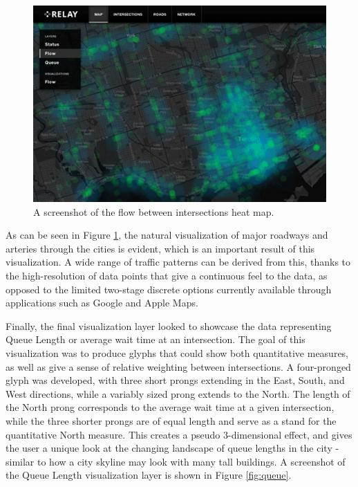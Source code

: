 \documentclass{report}
\begin{document}
\begin{figure}[htbp!]
  \begin{centering}
    \includegraphics[scale=0.9]{figures/flow-2.png}
    \caption{A screenshot of the flow between intersections heat map.}
    \label{fig:flow-2}
  \end{centering}
\end{figure}

As can be seen in Figure \ref{fig:flow-2}, the natural visualization of major roadways and arteries through the cities is evident, which is an important result of this visualization.
A wide range of traffic patterns can be derived from this, thanks to the high-resolution of data points that give a continuous feel to the data, as opposed to the limited two-stage discrete options currently available through applications such as Google and Apple Maps.

Finally, the final visualization layer looked to showcase the data representing Queue Length or average wait time at an intersection.
The goal of this visualization was to produce glyphs that could show both quantitative measures, as well as give a sense of relative weighting between intersections.
A four-pronged glyph was developed, with three short prongs extending in the East, South, and West directions, while a variably sized prong extends to the North.
The length of the North prong corresponds to the average wait time at a given intersection, while the three shorter prongs are of equal length and serve as a stand for the quantitative North measure.
This creates a pseudo 3-dimensional effect, and gives the user a unique look at the changing landscape of queue lengths in the city - similar to how a city skyline may look with many tall buildings.
A screenshot of the Queue Length visualization layer is shown in Figure \ref{fig:queue}.
\end{document}
